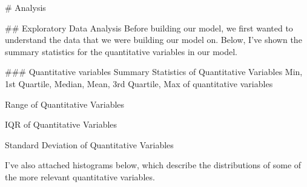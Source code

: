 # Analysis

## Exploratory Data Analysis
Before building our model, we first wanted to understand the data that we were building our model on. Below, I've shown the summary statistics for the quantitative variables in our model. 

### Quantitative variables
Summary Statistics of Quantitative Variables
Min, 1st Quartile, Median, Mean, 3rd Quartile, Max of quantitative variables

Range of Quantitative Variables

IQR of Quantitative Variables

Standard Deviation of Quantitative Variables


I've also attached histograms below, which describe the distributions of some of the more relevant quantitative variables. 

